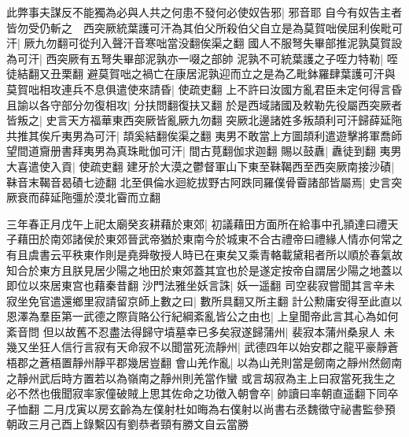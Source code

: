 此弊事夫謀反不能獨為必與人共之何患不發何必使奴告邪|{
	邪音耶}
自今有奴告主者皆勿受仍斬之　西突厥統葉護可汗為其伯父所殺伯父自立是為莫賀咄侯屈利俟毗可汗|{
	厥九勿翻可從刋入聲汗音寒咄當没翻俟渠之翻}
國人不服弩失畢部推泥孰莫賀設為可汗|{
	西突厥有五弩失畢部泥孰亦一啜之部帥}
泥孰不可統葉護之子咥力特勒|{
	咥徒結翻又丑栗翻}
避莫賀咄之禍亡在康居泥孰迎而立之是為乙毗鉢羅肆葉護可汗與莫賀咄相攻連兵不息俱遣使來請昏|{
	使疏吏翻}
上不許曰汝國方亂君臣未定何得言昏且諭以各守部分勿復相攻|{
	分扶問翻復扶又翻}
於是西域諸國及敕勒先役屬西突厥者皆叛之|{
	史言天方福華東西突厥皆亂厥九勿翻}
突厥北邊諸姓多叛頡利可汗歸薛延陁共推其俟斤夷男為可汗|{
	頡奚結翻俟渠之翻}
夷男不敢當上方圖頡利遣遊擊將軍喬師望間道齎册書拜夷男為真珠毗伽可汗|{
	間古莧翻伽求迦翻}
賜以鼓纛|{
	纛徒到翻}
夷男大喜遣使入貢|{
	使疏吏翻}
建牙於大漠之鬱督軍山下東至靺鞨西至西突厥南接沙磧|{
	靺音末鞨音曷磧七迹翻}
北至俱倫水迴紇拔野古阿跌同羅僕骨霫諸部皆屬焉|{
	史言突厥衰而薛延陁彊於漠北霫而立翻}


三年春正月戊午上祀太廟癸亥耕藉於東郊|{
	初議藉田方面所在給事中孔頴達曰禮天子藉田於南郊諸侯於東郊晉武帝猶於東南今於城東不合古禮帝曰禮緣人情亦何常之有且虞書云平秩東作則是堯舜敬授人時已在東矣又乘青輅載黛耜者所以順於春氣故知合於東方且朕見居少陽之地田於東郊蓋其宜也於是遂定按帝自謂居少陽之地蓋以即位以來居東宫也藉秦昔翻}
沙門法雅坐妖言誅|{
	妖一遥翻}
司空裴寂嘗聞其言辛未寂坐免官遣還鄉里寂請留京師上數之曰|{
	數所具翻又所主翻}
計公勲庸安得至此直以恩澤為羣臣第一武德之際貨賂公行紀綱紊亂皆公之由也|{
	上皇聞帝此言其心為如何紊音問}
但以故舊不忍盡法得歸守墳墓幸已多矣寂遂歸蒲州|{
	裴寂本蒲州桑泉人}
未幾又坐狂人信行言寂有天命寂不以聞當死流靜州|{
	武德四年以始安郡之龍平豪靜蒼梧郡之蒼梧置靜州靜平郡幾居豈翻}
會山羌作亂|{
	以為山羌則當是劒南之靜州然劒南之靜州武后時方置若以為嶺南之靜州則羌當作蠻}
或言刼寂為主上曰寂當死我生之必不然也俄聞寂率家僮破賊上思其佐命之功徵入朝會卒|{
	帥讀曰率朝直遥翻下同卒子恤翻}
二月戊寅以房玄齡為左僕射杜如晦為右僕射以尚書右丞魏徵守祕書監參預朝政三月己酉上錄繫囚有劉恭者頸有勝文自云當勝

